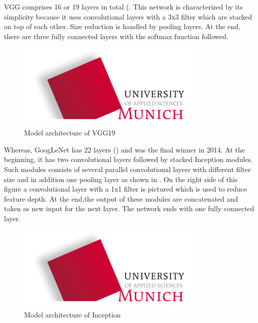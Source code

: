 VGG comprises 16 or 19 layers in total (. This network is characterized by its simplicity because it uses convolutional layers with a 3x3 filter which are stacked on top of each other. Size reduction is handled by pooling layers. At the end, there are three fully connected layers with the softmax function followed.

\begin{figure}[htbp]
\includegraphics[width=0.8\textwidth]{includes/MUASlogo}
\caption[Model architecture of VGG19]{Model architecture of VGG19 \citep{He2016}}
\label{fig:FH-Logo3}
\end{figure}

Whereas, GoogLeNet has 22 layers () and was the final winner in 2014. At the beginning, it has two convolutional layers followed by stacked Inception modules. Such modules consists of several parallel convolutional layers with different filter size and in addition one pooling layer as shown in . On the right side of this figure a convolutional layer with a 1x1 filter is pictured which is used to reduce feature depth. At the end,the output of these modules are concatenated and taken as new input for the next layer. The network ends with one fully connected layer.\\

\begin{figure}[htbp]
\includegraphics[width=0.8\textwidth]{includes/MUASlogo}
\caption[Model architecture of Inception]{Model architecture of Inception \citep{Szegedy2014}}
\label{fig:FH-Logo4}
\end{figure}

